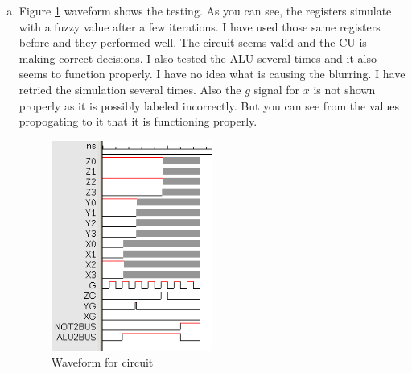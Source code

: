 \documentclass{article}
\begin{document}
\begin{enumerate}
{\begin{enumerate}[(a)]
        \item{
          Figure \ref{wave} waveform shows the testing. As you can see, the registers
          simulate with a fuzzy value after a few iterations. I have used those same
          registers before and they performed well. The circuit seems valid and the
          CU is making correct decisions. I also tested the ALU several times and
          it also seems to function properly. I have no idea what is causing the
          blurring. I have retried the simulation several times.
          Also the $g$ signal for $x$ is not shown properly as it is possibly
          labeled incorrectly. But you can see from the values propogating to
          it that it is functioning properly.
          \begin{figure}[h]
            \centering
            \includegraphics[width=150pt]{img/waveform}
            \caption{\label{wave} Waveform for circuit}
          \end{figure}
        }

      \end{enumerate}
    }
  \end{enumerate}
\end{document}
